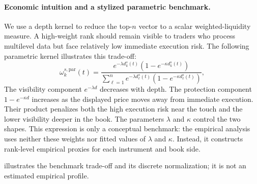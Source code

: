 \documentclass[11pt]{article}
\begin{document}
\paragraph{Economic intuition and a stylized parametric benchmark.}
We use a depth kernel to reduce the top-$n$ vector to a scalar weighted-liquidity measure. A high-weight rank should remain
visible to traders who process multilevel data but face relatively low immediate execution risk. The following parametric
kernel illustrates this trade-off:
\begin{equation}
    \omega^{s,\mathrm{par}}_{k}(t)
    =
    \frac{
        e^{-\lambda d^{s}_{k}(t)}
        \left(1-e^{-\kappa d^{s}_{k}(t)}\right)
    }{
        \sum_{\ell=1}^{n}
        e^{-\lambda d^{s}_{\ell}(t)}\left(
        1-e^{-\kappa d^{s}_{\ell}(t)}\right)
    },
    \label{eq:depth_kernel}
\end{equation}
The visibility component $e^{-\lambda d}$ decreases with depth. The protection component
$1-e^{-\kappa d}$ increases as the displayed price moves away from immediate execution. Their product penalizes both the
high execution risk near the touch and the lower visibility deeper in the book. The parameters $\lambda$ and $\kappa$
control the two shapes. This expression is only a conceptual benchmark: the empirical analysis uses neither these weights
nor fitted values of $\lambda$ and $\kappa$. Instead, it constructs rank-level empirical proxies for each instrument and
book side.

 illustrates the benchmark trade-off and its discrete normalization; it is not an
estimated empirical profile.
\end{document}
